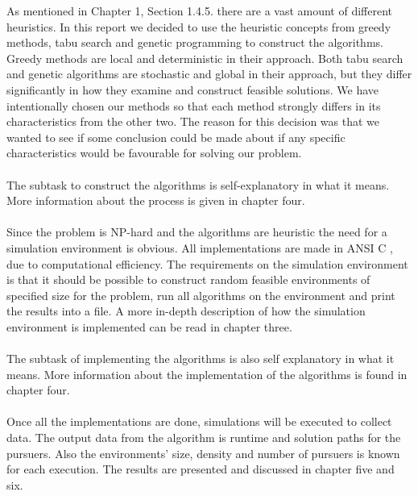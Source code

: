 As mentioned in Chapter 1, Section 1.4.5. there are a vast amount of different heuristics. In this report we decided to use the heuristic concepts from greedy methods, tabu search and genetic programming to construct the algorithms. Greedy methods are local and deterministic in their approach. Both tabu search and genetic algorithms are stochastic and global in their approach, but they differ significantly in how they examine and construct feasible solutions. We have intentionally chosen our methods so that each method strongly differs in its characteristics from the other two. The reason for this decision was that we wanted to see if some conclusion could be made about if any specific characteristics would be favourable for solving our problem.\\
\\
The subtask to construct the algorithms is self-explanatory in what it means. More information about the process is given in chapter four.\\
\\
Since the problem is NP-hard and the algorithms are heuristic the need for a simulation environment is obvious. All implementations are made in ANSI C \cite{C-bok}, due to computational efficiency. The requirements on the simulation environment is that it should be possible to construct random feasible environments of specified size for the problem, run all algorithms on the environment and print the results into a file. A more in-depth description of how the simulation environment is implemented can be read in chapter three.\\
\\
The subtask of implementing the algorithms is also self explanatory in what it means. More information about the implementation of the algorithms is found in chapter four.\\
\\
Once all the implementations are done, simulations will be executed to collect data. The output data from the algorithm is runtime and solution paths for the pursuers. Also the environments' size, density and number of pursuers is known for each execution. The results are presented and discussed in chapter five and six.